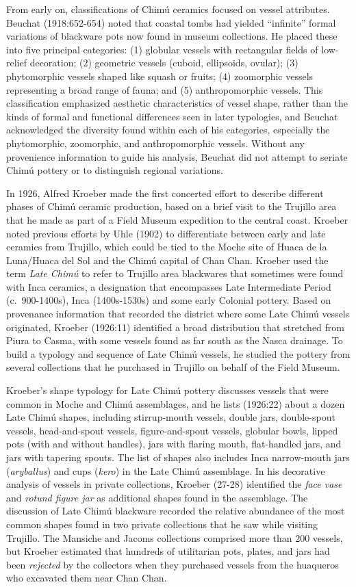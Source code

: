 \documentclass[]{interact}
\theoremstyle{plain}%
\theoremstyle{definition}
\theoremstyle{remark}
\begin{document}
From early on, classifications of Chimú ceramics focused on vessel
attributes. Beuchat (1918:652-654) noted that coastal tombs had yielded
``infinite'' formal variations of blackware pots now found in museum
collections. He placed these into five principal categories: (1)
globular vessels with rectangular fields of low-relief decoration; (2)
geometric vessels (cuboid, ellipsoids, ovular); (3) phytomorphic vessels
shaped like squash or fruits; (4) zoomorphic vessels representing a
broad range of fauna; and (5) anthropomorphic vessels. This
classification emphasized aesthetic characteristics of vessel shape,
rather than the kinds of formal and functional differences seen in later
typologies, and Beuchat acknowledged the diversity found within each of
his categories, especially the phytomorphic, zoomorphic, and
anthropomorphic vessels. Without any provenience information to guide
his analysis, Beuchat did not attempt to seriate Chimú pottery or to
distinguish regional variations.

In 1926, Alfred Kroeber made the first concerted effort to describe
different phases of Chimú ceramic production, based on a brief visit to
the Trujillo area that he made as part of a Field Museum expedition to
the central coast. Kroeber noted previous efforts by Uhle (1902) to
differentiate between early and late ceramics from Trujillo, which could
be tied to the Moche site of Huaca de la Luna/Huaca del Sol and the
Chimú capital of Chan Chan. Kroeber used the term \emph{Late Chimú} to
refer to Trujillo area blackwares that sometimes were found with Inca
ceramics, a designation that encompasses Late Intermediate Period
(c.~900-1400s), Inca (1400s-1530s) and some early Colonial pottery.
Based on provenance information that recorded the district where some
Late Chimú vessels originated, Kroeber (1926:11) identified a broad
distribution that stretched from Piura to Casma, with some vessels found
as far south as the Nasca drainage. To build a typology and sequence of
Late Chimú vessels, he studied the pottery from several collections that
he purchased in Trujillo on behalf of the Field Museum.

Kroeber's shape typology for Late Chimú pottery discusses vessels that
were common in Moche and Chimú assemblages, and he lists (1926:22) about
a dozen Late Chimú shapes, including stirrup-mouth vessels, double jars,
double-spout vessels, head-and-spout vessels, figure-and-spout vessels,
globular bowls, lipped pots (with and without handles), jars with
flaring mouth, flat-handled jars, and jars with tapering spouts. The
list of shapes also includes Inca narrow-mouth jars (\emph{aryballus})
and cups (\emph{kero}) in the Late Chimú assemblage. In his decorative
analysis of vessels in private collections, Kroeber (27-28) identified
the \emph{face vase} and \emph{rotund figure jar} as additional shapes
found in the assemblage. The discussion of Late Chimú blackware recorded
the relative abundance of the most common shapes found in two private
collections that he saw while visiting Trujillo. The Mansiche and Jacoms
collections comprised more than 200 vessels, but Kroeber estimated that
hundreds of utilitarian pots, plates, and jars had been \emph{rejected}
by the collectors when they purchased vessels from the huaqueros who
excavated them near Chan Chan.
\end{document}

